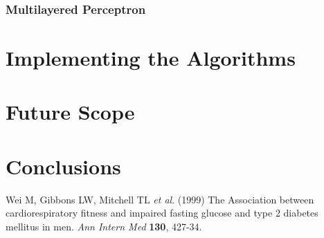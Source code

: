 \documentclass[12pt]{article}
\begin{document}
\section{Multilayered Perceptron}
\newpage
\part{Implementing the Algorithms}
\newpage
\part{Future Scope}
\newpage
\part{Conclusions}
\clearpage

\newpage
\begin{thebibliography}{}

Wei M, Gibbons LW, Mitchell TL \textit{et al}. (1999) The Association between cardiorespiratory fitness and impaired fasting glucose and type 2 diabetes mellitus in men. \textit{Ann Intern Med} \textbf{130}, 427-34.

\end{thebibliography}
\end{document}

